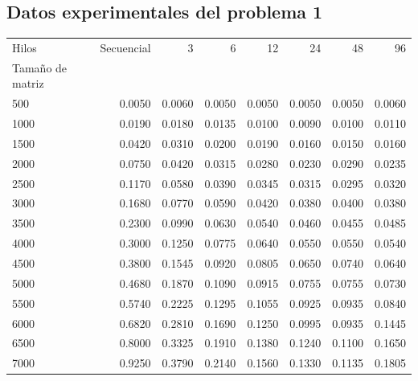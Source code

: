 \documentclass{report}
\begin{document}
\begin{appendices}

\chapter{Datos experimentales del problema 1}
\label{appendix:starresults}

\begin{table}[H]
\begin{tabular}{lrrrrrrr}
\toprule
Hilos &  Secuencial &       3 &       6 &      12 &      24 &      48 &      96 \\
Tamaño de matriz &             &         &         &         &         &         &         \\
\midrule
500              &      0.0050 &  0.0060 &  0.0050 &  0.0050 &  0.0050 &  0.0050 &  0.0060 \\
1000             &      0.0190 &  0.0180 &  0.0135 &  0.0100 &  0.0090 &  0.0100 &  0.0110 \\
1500             &      0.0420 &  0.0310 &  0.0200 &  0.0190 &  0.0160 &  0.0150 &  0.0160 \\
2000             &      0.0750 &  0.0420 &  0.0315 &  0.0280 &  0.0230 &  0.0290 &  0.0235 \\
2500             &      0.1170 &  0.0580 &  0.0390 &  0.0345 &  0.0315 &  0.0295 &  0.0320 \\
3000             &      0.1680 &  0.0770 &  0.0590 &  0.0420 &  0.0380 &  0.0400 &  0.0380 \\
3500             &      0.2300 &  0.0990 &  0.0630 &  0.0540 &  0.0460 &  0.0455 &  0.0485 \\
4000             &      0.3000 &  0.1250 &  0.0775 &  0.0640 &  0.0550 &  0.0550 &  0.0540 \\
4500             &      0.3800 &  0.1545 &  0.0920 &  0.0805 &  0.0650 &  0.0740 &  0.0640 \\
5000             &      0.4680 &  0.1870 &  0.1090 &  0.0915 &  0.0755 &  0.0755 &  0.0730 \\
5500             &      0.5740 &  0.2225 &  0.1295 &  0.1055 &  0.0925 &  0.0935 &  0.0840 \\
6000             &      0.6820 &  0.2810 &  0.1690 &  0.1250 &  0.0995 &  0.0935 &  0.1445 \\
6500             &      0.8000 &  0.3325 &  0.1910 &  0.1380 &  0.1240 &  0.1100 &  0.1650 \\
7000             &      0.9250 &  0.3790 &  0.2140 &  0.1560 &  0.1330 &  0.1135 &  0.1805 \\

\end{tabular}
\end{table}
\end{appendices}
\end{document}
